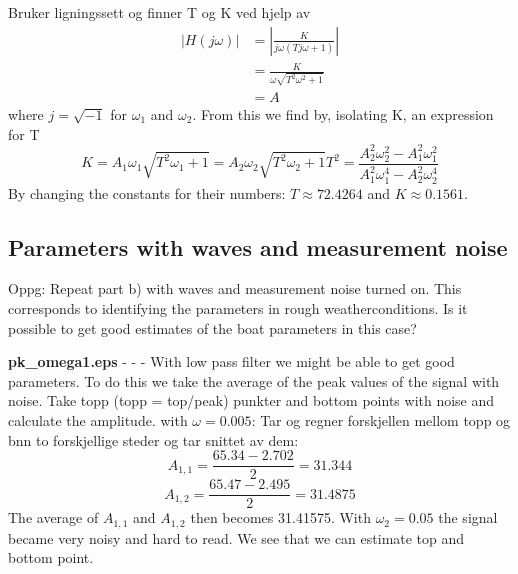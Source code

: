 Bruker ligningssett og finner T og K ved hjelp av 
\begin{equation} \label{eq:transferfunction}
\begin{split}
    |H(j\omega)| &= \left| \frac{K}{j\omega(Tj\omega + 1)} \right| \\
    &= \frac{K}{\omega \sqrt{T^2 \omega^2 + 1}} \\
    &= A
\end{split}
\end{equation}
where $j = \sqrt{-1}$ for $\omega_1$ and $\omega_2$. From this we find by, isolating K, an expression for T
\begin{subequations}
\begin{equation}
    K = A_1 \omega_1 \sqrt{T^2 \omega_1 + 1} = A_2 \omega_2 \sqrt{T^2 \omega_2 + 1} \label{eq:K_def}
\end{equation}
\begin{equation}
    T^2 = \frac{A_2^2 \omega_2^2 - A_1^2 \omega_1^2}{A_1^2 \omega_1^4 - A_2^2 \omega_2^4} \label{eq:T_def}
\end{equation}
\end{subequations}
By changing the constants for their numbers: $T \approx 72.4264$ and $K \approx 0.1561$.

\subsection{Parameters with waves and measurement noise}
Oppg: Repeat part b) with waves and measurement noise turned on. This corresponds to identifying the parameters in rough weatherconditions. Is it possible to get good estimates of the boat parameters in this case?
\bigskip

\textbf{pk\_omega1.eps} - - - With low pass filter we might be able to get good parameters. To do this we take the average of the peak values of the signal with noise. Take topp (topp = top/peak) punkter and bottom points with noise and calculate the amplitude. with $\omega = 0.005$: Tar og regner forskjellen mellom topp og bnn to forskjellige steder og tar snittet av dem:
\begin{equation*}
    A_{1,1} = \frac{65.34 - 2.702}{2} = 31.344
\end{equation*}
\begin{equation*}
    A_{1,2} = \frac{65.47 - 2.495}{2} = 31.4875
\end{equation*}
The average of $A_{1,1}$ and $A_{1,2}$ then becomes 31.41575. With $\omega_2 = 0.05$ the signal became very noisy and hard to read. We see that we can estimate top and bottom point.
\bigskip

